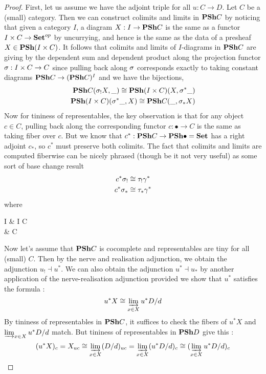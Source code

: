 \documentclass{article}
\begin{document}
\begin{proof}
  First, let us assume we have the adjoint triple for all $u : C \to D$.
  Let $C$ be a (small) category.
  Then we can construct colimits and limits in $\mathbf{PSh} C$
  by noticing that given a category $I$,
  a diagram $X : I \to \mathbf{PSh} C$ is the same as 
  a functor $I \times C \to \mathbf{Set}^{op}$ by uncurrying,
  and hence is the same as the data of a presheaf $X \in \mathbf{PSh} (I \times C)$.
  It follows that colimits and limits of $I$-diagrams in $\mathbf{PSh} C$
  are giving by the dependent sum and dependent product
  along the projection functor $\sigma : I \times C \to C$ since
  pulling back along $\sigma$ corresponds exactly to 
  taking constant diagrams $\mathbf{PSh} C \to (\mathbf{PSh} C)^I$
  and we have the bijections,
  \begin{align*}
    \mathbf{PSh} C (\sigma_! X , \_ ) \cong \mathbf{PSh}(I \times C) (X , \sigma^* \_) \\
    \mathbf{PSh} (I \times C) (\sigma^* \_ , X) \cong \mathbf{PSh} C (\_ , \sigma_* X)
  \end{align*}
  Now for tininess of representables,
  the key observation is that for any object $c \in C$,
  pulling back along the corresponding functor $c : \bullet \to C$
  is the same as taking fiber over $c$.
  But we know that $c^* : \mathbf{PSh} C \to \mathbf{PSh} \bullet = \mathbf{Set}$
  has a right adjoint $c_*$,
  so $c^*$ must preserve both colimits.
  The fact that colimits and limits are computed fiberwise
  can be nicely phrased (though be it not very useful) as
  some sort of base change result
  \begin{align*}
    c^* \sigma_! &\cong \tau_! \gamma^* \\
    c^* \sigma_* &\cong \tau_* \gamma^*
  \end{align*}
  where
  \begin{cd}
    I & {I \times C} \\
    \bullet & C
    \arrow["\tau"', from=1-1, to=2-1]
    \arrow["\gamma", from=1-1, to=1-2]
    \arrow["c"', from=2-1, to=2-2]
    \arrow["\sigma", from=1-2, to=2-2]
    \arrow["\lrcorner"{anchor=center, pos=0.125}, draw=none, from=1-1, to=2-2]
  \end{cd}

  Now let's assume that $\mathbf{PSh} C$ is cocomplete
  and representables are tiny for all (small) $C$.
  Then by the nerve and realisation adjunction,
  we obtain the adjunction $u_! \dashv u^*$.
  We can also obtain the adjunction $u^* \dashv u_*$ by
  another application of the nerve-realisation adjunction
  provided we show that $u^*$ satisfies the formula : 
  \[
    u^* X \cong \varinjlim_{x \in X} u^* D / d
  \]
  By tininess of representables in $\mathbf{PSh} C$,
  it suffices to check the fibers of $u^* X$ and 
  $\varinjlim_{x \in X} u^* D / d$ match.
  But tininess of representables in $\mathbf{PSh} D$ give this : 
  \[
    (u^* X)_c = X_{u c}
    \cong \varinjlim_{x \in X} (D / d)_{u c}
    = \varinjlim_{x \in X} (u^* D / d)_c
    \cong (\varinjlim_{x \in X} u^* D / d)_c
  \]


\end{proof}
\end{document}
